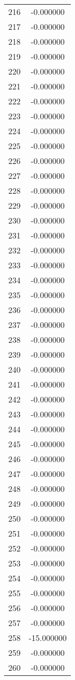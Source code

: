 \documentclass[12pt]{article}
\begin{document}
\begin{longtable}{@{}cc@{}}
216 & -0.000000 \\
217 & -0.000000 \\
218 & -0.000000 \\
219 & -0.000000 \\
220 & -0.000000 \\
221 & -0.000000 \\
222 & -0.000000 \\
223 & -0.000000 \\
224 & -0.000000 \\
225 & -0.000000 \\
226 & -0.000000 \\
227 & -0.000000 \\
228 & -0.000000 \\
229 & -0.000000 \\
230 & -0.000000 \\
231 & -0.000000 \\
232 & -0.000000 \\
233 & -0.000000 \\
234 & -0.000000 \\
235 & -0.000000 \\
236 & -0.000000 \\
237 & -0.000000 \\
238 & -0.000000 \\
239 & -0.000000 \\
240 & -0.000000 \\
241 & -0.000000 \\
242 & -0.000000 \\
243 & -0.000000 \\
244 & -0.000000 \\
245 & -0.000000 \\
246 & -0.000000 \\
247 & -0.000000 \\
248 & -0.000000 \\
249 & -0.000000 \\
250 & -0.000000 \\
251 & -0.000000 \\
252 & -0.000000 \\
253 & -0.000000 \\
254 & -0.000000 \\
255 & -0.000000 \\
256 & -0.000000 \\
257 & -0.000000 \\
258 & -15.000000 \\
259 & -0.000000 \\
260 & -0.000000 \\

\end{longtable}
\end{document}
